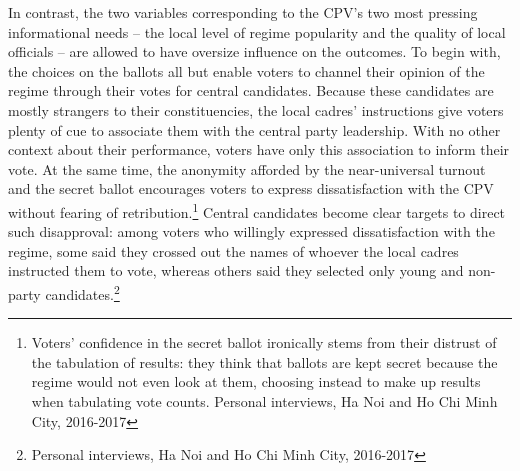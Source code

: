 \documentclass[12pt]{article}
\newcommand{\1}{\mathbbm{1}}
\begin{document}
In contrast, the two variables corresponding to the CPV's two most pressing informational needs -- the local level of regime popularity and the quality of local officials -- are allowed to have oversize influence on the outcomes. To begin with, the choices on the ballots all but enable voters to channel their opinion of the regime through their votes for central candidates. Because these candidates are mostly strangers to their constituencies, the local cadres' instructions give voters plenty of cue to associate them with the central party leadership. With no other context about their performance, voters have only this association to inform their vote. At the same time, the anonymity afforded by the near-universal turnout and the secret ballot encourages voters to express dissatisfaction with the CPV without fearing of retribution.\footnote{Voters' confidence in the secret ballot ironically stems from their distrust of the tabulation of results: they think that ballots are kept secret because the regime would not even look at them, choosing instead to make up results when tabulating vote counts. Personal interviews, Ha Noi and Ho Chi Minh City, 2016-2017} Central candidates become clear targets to direct such disapproval: among voters who willingly expressed dissatisfaction with the regime, some said they crossed out the names of whoever the local cadres instructed them to vote, whereas others said they selected only young and non-party candidates.\footnote{Personal interviews, Ha Noi and Ho Chi Minh City, 2016-2017}
\end{document}
